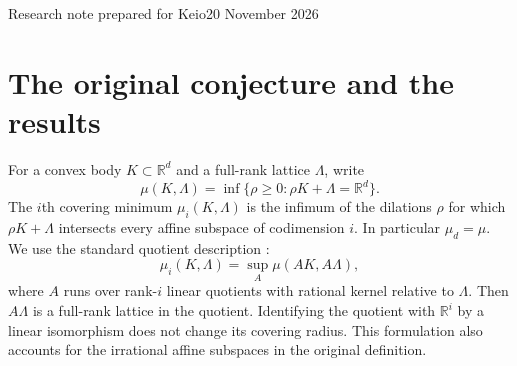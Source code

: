 \documentclass[11pt,a4paper]{article}
\theoremstyle{remark}
\newcommand{\R}{\mathbb R}\newcommand{\Z}{\mathbb Z}
\begin{document}
\par\medskip
{}
\medskip
{}\par
\medskip
\noindent Research note prepared for Keio\hfill 20 November 2026

\begin{abstract}
We give explicit counterexamples to Conjecture 5.3 of
Codenotti--Santos--Schymura on the covering minima of weighted terminal
simplices. For every real $r>1$, the tetrahedron
$K_r=S(1,1,r,r)$ has a rank-two lattice quotient with covering radius
$\tfrac12+\tfrac1{r+1}$, strictly exceeding the conjectured value
$(r+2)/(2r+1)$. For every integer $m\ge2$, a previously proved planar
covering theorem bounds every rank-two quotient and gives the exact value
$\mu_2(K_m)=\tfrac12+\tfrac1{m+1}$. Thus the conjecture already fails
in the smallest possible ambient dimension, three; the example
$S(1,1,2,2)$ has $\mu_2=5/6$, rather than $4/5$.
The construction was obtained by transferring the weighted fractional-part
method of VMRC [200]. We supply an elementary independent proof of the
counterexample and a separate exact fractional-part certificate.
We also reduce the equality-classification counterexample from [200]
to the smallest possible dimension, four, and obtain five-dimensional
counterexamples to the equality clause of Conjecture D for every integer
$k\ge2$. The numerical upper bound of Conjecture D in general dimension
is not addressed.
\end{abstract}

\section{The original conjecture and the results}
For a convex body $K\subset\R^d$ and a full-rank lattice $\Lambda$, write
\[
 \mu(K,\Lambda)=\inf\{\rho\ge0:\rho K+\Lambda=\R^d\}.
\]
The $i$th covering minimum $\mu_i(K,\Lambda)$ is the infimum of the
dilations $\rho$ for which $\rho K+\Lambda$ intersects every affine
subspace of codimension $i$. In particular $\mu_d=\mu$.
We use the standard quotient description \cite[Section 1]{CSS}:
\begin{equation}\label{eq:quotient}
 \mu_i(K,\Lambda)=\sup_{A}\mu(AK,A\Lambda),
\end{equation}
where $A$ runs over rank-$i$ linear quotients with rational kernel
relative to $\Lambda$. Then $A\Lambda$ is a full-rank lattice in the
quotient. Identifying the quotient with $\R^i$ by a linear isomorphism
does not change its covering radius. This formulation also accounts
for the irrational affine subspaces in the original definition.
\end{document}
